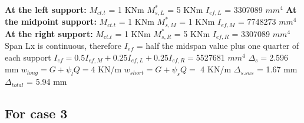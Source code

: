 \documentclass{article}%
\begin{document}
%
\newline%
\newline%
%
\textbf{At the left support:}%
\newline%
\newline%
%
$M_{ct.t}$ = 1 KNm%
\newline%
%
$M_{s,L}^{*}$ = 5 KNm%
\newline%
%
$I_{ef,L}$ = 3307089 $mm^{4}$%
\newline%
\newline%
%
\textbf{At the midpoint support:}%
\newline%
\newline%
%
$M_{ct.t}$ = 1 KNm%
\newline%
%
$M_{s,M}^{*}$ = 1 KNm%
\newline%
%
$I_{ef,M}$ = 7748273 $mm^{4}$%
\newline%
\newline%
%
\textbf{At the right support:}%
\newline%
\newline%
%
$M_{ct.t}$ = 1 KNm%
\newline%
%
$M_{s,R}^{*}$ = 5 KNm%
\newline%
%
$I_{ef,R}$ = 3307089 $mm^{4}$%
\newline%
\newline%
%
Span Lx is continuous, therefore $I_{ef}$ = half the midspan value plus one quarter of each support%
\newline%
\newline%
%
$I_{ef} = 0.5I_{ef,M} + 0.25I_{ef,L} + 0.25I_{ef,R} = $5527681 $ mm^{4}$%
\newline%
\newline%
%
$\Delta_{s} =$2.596 mm%
\newline%
\newline%
%
$w_{long} = G + \psi_{l}Q = $4 KN/m%
\newline%
%
$w_{short} = G + \psi_{s}Q = $ 4 KN/m%
\newline%
\newline%
%
$\Delta_{s.sus}$ = 1.67 mm%
\newline%
\newline%
%
$\Delta_{total}$ = 5.94 mm%
\subsection*{For case 3}%
\label{subsec:Forcase3}%
\end{document}
